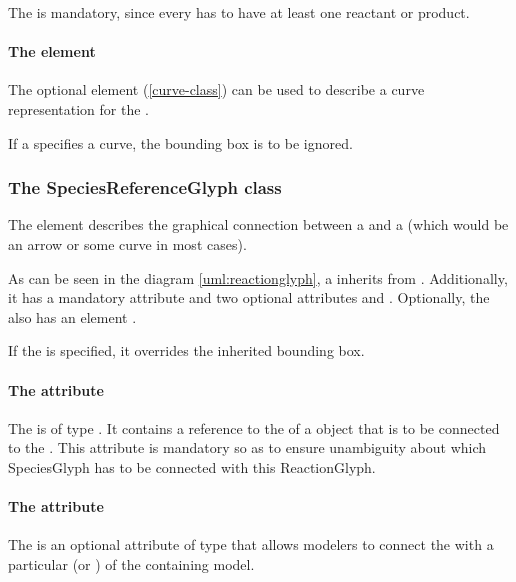 The \ListOfSpeciesReferenceGlyphs is mandatory, since every \Reaction 
has to have at least one reactant or product. 


\paragraph {The  element}
The optional \Curve element (\ref{curve-class}) can be used to describe 
a curve representation for the \ReactionGlyph. 

If a \ReactionGlyph specifies a curve, the bounding box is to be 
ignored. 


\subsubsection{The SpeciesReferenceGlyph class}
\label{speciesreferenceglyph-class}
The  element describes the graphical 
connection between a \SpeciesGlyph and a \ReactionGlyph (which would be 
an arrow or some curve in most cases). 

As can be seen in the diagram \ref{uml:reactionglyph}, a 
\SpeciesReferenceGlyph inherits from \GraphicalObject. Additionally, it 
has a mandatory attribute  and two optional 
attributes  and . Optionally, the 
\SpeciesReferenceGlyph also has an element . 

If the  is specified, it overrides the inherited bounding box.


\paragraph{The  attribute}
The  is of type . It contains a 
reference to the  of a \SpeciesGlyph object that is to be 
connected to the \ReactionGlyph. 
This attribute is mandatory so as to ensure unambiguity about which 
SpeciesGlyph has to be connected with this ReactionGlyph. 

\paragraph{The  attribute}
The  is an optional attribute of type 
 that allows modelers to connect the \SpeciesReferenceGlyph with 
a particular \SpeciesReference (or \ModifierSpeciesReference) of the 
containing model. 

